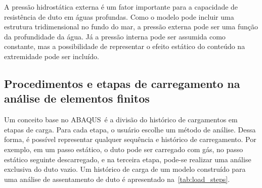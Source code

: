 A pressão hidrostática externa é um fator importante para a capacidade de resistência de duto em águas profundas.
Como o modelo pode incluir uma estrutura tridimensional no fundo do mar, a pressão externa pode ser uma função da profundidade da água.
Já a pressão interna pode ser assumida como constante, mas a possibilidade de representar o efeito estático do conteúdo na extremidade pode ser incluído.


\subsection{Procedimentos e etapas de carregamento na análise de elementos finitos}


Um conceito base no ABAQUS~é a divisão do histórico de cargamentos em etapas de carga. Para cada etapa, o usuário escolhe um método de análise.
Dessa forma, é possível representar qualquer sequência  e histórico de carregamento.
Por exemplo, em um passo estático, o duto pode ser carregado com gás, no passo estático seguinte descarregado, e na terceira etapa, pode-se realizar uma análise exclusiva do duto vazio.
Um histórico de carga de um modelo construído para uma análise de assentamento de duto é apresentado na~\autoref{tab:load_steps}.


